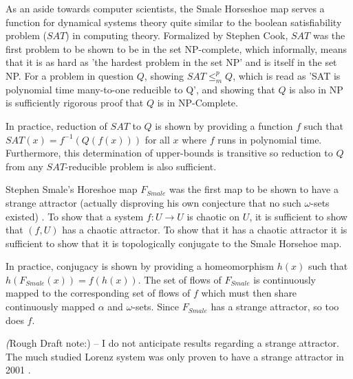 \documentclass{elsart1p}
\begin{document}
As an aside towards computer scientists, the Smale Horseshoe map serves
a function for dynamical systems theory quite similar to the 
boolean satisfiability problem ($SAT$) in computing theory.  Formalized by
Stephen Cook, $SAT$ was the first
problem to be shown to be in the set NP-complete, which informally, means that
it is as hard as 'the hardest problem in the set NP' and is itself in the set
NP.  For a problem in question $Q$, showing $SAT \leq_{m}^{p} Q$, which is 
read as 'SAT is polynomial time many-to-one reducible to Q', 
and showing that $Q$ is also in NP is sufficiently 
rigorous proof that $Q$ is in NP-Complete.  

In practice, reduction of $SAT$ to $Q$ is shown by providing a function $f$ 
such that
$SAT(x) = f^{-1}(Q(f(x)))$ for all $x$ where $f$ runs in polynomial time.
Furthermore, this determination of upper-bounds is transitive so reduction 
to $Q$ from any $SAT$-reducible problem is also sufficient.\cite{complexity}

Stephen Smale's Horeshoe map $F_{Smale}$ was the first map to be shown to 
have a strange
attractor (actually disproving his own conjecture that no such $\omega$-sets 
        existed)
\cite{history}.  To show that a system $f : U \rightarrow U$ is chaotic
on $U$, 
it is sufficient
to show that $(f,U)$ has a chaotic attractor.  To show that it has a
chaotic attractor it is sufficient to show that it is topologically conjugate
to the Smale Horsehoe map.  

In practice, conjugacy is shown 
by providing a homeomorphism $h(x)$ such that $h(F_{Smale}(x)) = f(h(x))$.
The set of flows of $F_{Smale}$ is continuously mapped to the
corresponding set of flows of $f$ which must then share continuously
mapped $\alpha$ and $\omega$-sets.  Since $F_{Smale}$ has a strange
attractor, so too does $f$.

\textit(Rough Draft note:)  -- I do not anticipate results regarding
a strange attractor.  The much studied Lorenz system 
was only proven to have a strange attractor
in 2001 \cite{warwick}.


%
%
%
%
%
%
%
%
\end{document}
